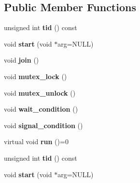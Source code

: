 \subsection*{Public Member Functions}
\begin{DoxyCompactItemize}
\item 
\hypertarget{class_thread_a558b33b40917b48051569526b4c5ec85}{unsigned int {\bfseries tid} () const }\label{class_thread_a558b33b40917b48051569526b4c5ec85}

\item 
\hypertarget{class_thread_a4622078eac94394b7a7f06d4af0db9ea}{void {\bfseries start} (void $\ast$arg=N\-U\-L\-L)}\label{class_thread_a4622078eac94394b7a7f06d4af0db9ea}

\item 
\hypertarget{class_thread_a4d9d788e98388a3217831a9046709deb}{void {\bfseries join} ()}\label{class_thread_a4d9d788e98388a3217831a9046709deb}

\item 
\hypertarget{class_thread_abebed72ba5d26e986574371a5371b024}{void {\bfseries mutex\-\_\-lock} ()}\label{class_thread_abebed72ba5d26e986574371a5371b024}

\item 
\hypertarget{class_thread_a21c6a56830820fdf99d2bb6d99a19081}{void {\bfseries mutex\-\_\-unlock} ()}\label{class_thread_a21c6a56830820fdf99d2bb6d99a19081}

\item 
\hypertarget{class_thread_a91a2e7457bcdaa818928ae53cb983e9d}{void {\bfseries wait\-\_\-condition} ()}\label{class_thread_a91a2e7457bcdaa818928ae53cb983e9d}

\item 
\hypertarget{class_thread_a18c72fa2b30643a324b24dc9a7227650}{void {\bfseries signal\-\_\-condition} ()}\label{class_thread_a18c72fa2b30643a324b24dc9a7227650}

\item 
\hypertarget{class_thread_aae90dfabab3e1776cf01a26e7ee3a620}{virtual void {\bfseries run} ()=0}\label{class_thread_aae90dfabab3e1776cf01a26e7ee3a620}

\item 
\hypertarget{class_thread_a558b33b40917b48051569526b4c5ec85}{unsigned int {\bfseries tid} () const }\label{class_thread_a558b33b40917b48051569526b4c5ec85}

\item 
\hypertarget{class_thread_a4622078eac94394b7a7f06d4af0db9ea}{void {\bfseries start} (void $\ast$arg=N\-U\-L\-L)}\label{class_thread_a4622078eac94394b7a7f06d4af0db9ea}


\end{DoxyCompactItemize}

